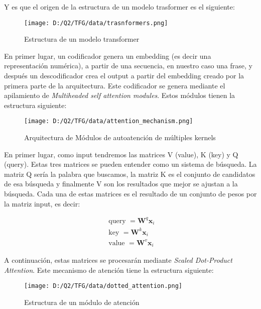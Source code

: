 \documentclass[10pt,riqno,a4paper,twoside]{article}\usepackage[]{graphicx}\usepackage[]{color}
\begin{document}
Y es que el origen de la estructura de un modelo trasformer es el siguiente: 


\begin{figure}[h]
\begin{center}
  \caption{Estructura de un modelo transformer}
\texttt{[image: D:/Q2/TFG/data/trasnformers.png]}
\end{center}
\end{figure}


En primer lugar, un codificador genera un embedding (es decir una representación numérica), a partir de una secuencia, en nuestro caso una frase,  y después un descodificador crea el output a partir del embedding creado por la primera parte de la arquitectura. Este codificador se genera mediante el apilamiento de \textit{Multiheaded self attention modules}. Estos módulos tienen la estructura siguiente: 

\begin{figure}[h]
  \caption{Arquitectura de Módulos de autoatención de múltiples kernels}
  \begin{center}
\texttt{[image: D:/Q2/TFG/data/attention\_mechanism.png]}
\end{center}
\end{figure}


En primer lugar, como input tendremos las matrices V (value), K (key) y Q (query). Estas tres matrices se pueden entender como un sistema de búsqueda. La matriz Q sería la palabra que buscamos, la matriz K es el conjunto de candidatos de esa búsqueda y finalmente V son los resultados que mejor se ajustan a la búsqueda. Cada una de estas matrices es el resultado de un conjunto de pesos por la matriz input, es decir: 

$$
\begin{gathered}
\text { query }=\boldsymbol{W}^{q} \boldsymbol{x}_{i} \\
\text { key }=\boldsymbol{W}^{k} \boldsymbol{x}_{i} \\
\text { value }=\boldsymbol{W}^{v} \boldsymbol{x}_{i}
\end{gathered}
$$


A continuación, estas matrices se procesarán mediante \textit{Scaled Dot-Product Attention}. Este mecanismo de atención tiene la estructura siguiente: 

\begin{figure}[h]
  \caption{Estructura de un módulo de atención}
  \begin{center}
\texttt{[image: D:/Q2/TFG/data/dotted\_attention.png]}
\end{center}
\end{figure}
\end{document}

